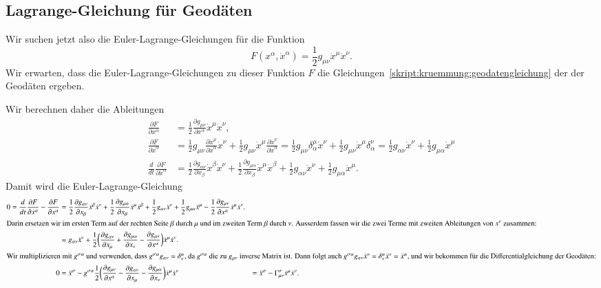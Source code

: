 \subsection{Lagrange-Gleichung für Geodäten}
Wir suchen jetzt also die Euler-Lagrange-Gleichungen für die Funktion
\[
F(x^\alpha, \dot x^\alpha) = \frac12 g_{\mu\nu} \dot x^\mu \dot x^\nu.
\]
Wir erwarten, dass die Euler-Lagrange-Gleichungen zu dieser Funktion $F$
die Gleichungen~\eqref{skript:kruemmung:geodatengleichung}
der der Geodäten ergeben.

Wir berechnen daher die Ableitungen
\begin{align*}
\frac{\partial F}{\partial x^\alpha}
&=
\frac12\frac{\partial g_{\mu\nu}}{\partial x^\alpha} \dot x^\mu \dot x^\nu,
\\
\frac{\partial F}{\partial \dot x^\alpha}
&=
\frac12 g_{\mu\nu}\frac{\partial \dot x^\mu}{\partial \dot x^\alpha}\dot x^\nu
+
\frac12 g_{\mu\nu}\dot x^\mu \frac{\partial \dot x^\nu}{\partial \dot x^\alpha}
=
\frac12 g_{\mu\nu}\delta^\mu_\alpha \dot x^\nu
+
\frac12 g_{\mu\nu}\dot x^\mu \delta^\nu_\alpha 
=
\frac12 g_{\alpha\nu}\dot x^\nu
+
\frac12 g_{\mu\alpha}\dot x^\mu 
\\
\frac{d}{dt}\frac{\partial F}{\partial \dot x^\alpha}
&=
\frac12\frac{\partial g_{\alpha\nu}}{\partial x_{\beta}}\dot x^\beta\dot x^\nu
+
\frac12\frac{\partial g_{\mu\alpha}}{\partial x_{\beta}}\dot x^\mu\dot x^\beta
+
\frac12g_{\alpha\nu}\ddot x^\nu
+
\frac12g_{\mu\alpha}\ddot x^\mu.
\end{align*}
Damit wird die Euler-Lagrange-Gleichung
\begin{align*}
0=
\frac{d}{dt}\frac{\partial F}{\partial \dot x^\alpha}
-
\frac{\partial F}{\partial x^\alpha}
&=
\frac12
\frac{\partial g_{\alpha\nu}}{\partial x_{\beta}}\dot x^\beta\dot x^\nu
+
\frac12
\frac{\partial g_{\mu\alpha}}{\partial x_{\beta}}\dot x^\mu\dot x^\beta
+
\frac12
g_{\alpha\nu}\ddot x^\nu
+
\frac12
g_{\mu\alpha}\ddot x^\mu
-
\frac12\frac{\partial g_{\mu\nu}}{\partial x^\alpha} \dot x^\mu \dot x^\nu.
\\
\intertext{Darin ersetzen wir im ersten Term auf der rechten Seite
$\beta$ durch $\mu$ und im zweiten Term $\beta$ durch $\nu$.
Ausserdem fassen wir die zwei Terme mit zweiten Ableitungen von $x^\nu$
zusammen:}
&=
g_{\alpha\nu}\ddot x^\nu
+
\frac12
\biggl(
\frac{\partial g_{\alpha\nu}}{\partial x_\mu}
+
\frac{\partial g_{\mu\alpha}}{\partial x_\nu}
-
\frac{\partial g_{\mu\nu}}{\partial x^\alpha}
\biggr)\dot x^\mu\dot x^\nu.
\\
\intertext{%
Wir multiplizieren mit $g^{\sigma\alpha}$ und verwenden,
dass $g^{\sigma\alpha}g_{\alpha\nu} = \delta_\nu^\alpha$, da $g^{\sigma\alpha}$
die zu $g_{\mu\nu}$ inverse Matrix ist.
Dann folgt auch
$g^{\sigma\alpha}g_{\alpha\nu}\ddot x^\nu
=
\delta_\nu^\alpha\ddot x^\nu
=
\ddot x^\alpha$, und
wir bekommen für die Differentialgleichung der Geodäten:}
0&=
\ddot x^\sigma
-
g^{\sigma\alpha}\frac12\biggl(
\frac{\partial g_{\mu\nu}}{\partial x^\alpha}
-
\frac{\partial g_{\alpha\nu}}{\partial x_{\mu}}
-
\frac{\partial g_{\mu\alpha}}{\partial x_{\nu}}
\biggr)
\dot x^\mu\dot x^\nu
&=
\ddot x^\sigma
-
\Gamma_{\mu\nu}^\sigma \dot x^\mu\dot x^\nu.
\end{align*}
